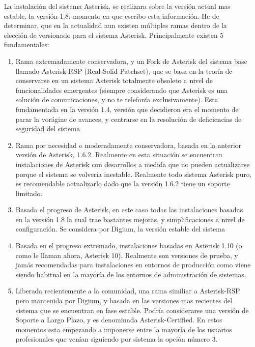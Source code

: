 La instalación del sistema Asterisk, se realizara sobre la versión actual mas estable, la versión 1.8, momento en que escribo esta información. He de determinar, que en la actualidad aun existen múltiples ramas dentro de la elección de versionado para el sistema Asterisk. Principalmente existen 5 fundamentales:

\begin{enumerate}

\item Rama extremadamente conservadora, y un Fork de Asterisk del sistema base llamado Asterisk-RSP (Real Solid Patchset), que se basa en la teoría de conservarse en un sistema Asterisk totalmente obsoleto a nivel de funcionalidades emergentes (siempre considerando que Asterisk es una solución de comunicaciones, y no te telefonía exclusivamente). Esta fundamentada en la versión 1.4, versión que decidieron era el momento de parar la vorágine de avances, y centrarse en la resolución de deficiencias de seguridad del sistema
\item Rama por necesidad o moderadamente conservadora, basada en la anterior versión de Asterisk, 1.6.2. Realmente en esta situación se encuentran instalaciones de Asterisk con desarrollos a medida que no pueden actualizarse porque el sistema se volvería inestable. Realmente todo sistema Asterisk puro, es recomendable actualizarlo dado que la versión 1.6.2 tiene un soporte limitado.
\item Basada el progreso de Asterisk, en este caso todas las instalaciones basadas en la versión 1.8 la cual trae bastantes mejoras, y simplificaciones a nivel de configuración. Se considera por Digium, la versión estable del sistema
\item Basada en el progreso extremado, instalaciones basadas en Asterisk 1.10 (o como le llaman ahora, Asterisk 10). Realmente son versiones de prueba, y jamás recomendadas para instalaciones en entornos de producción como viene siendo habitual en la mayoría de los entornos de administración de sistemas.
\item Liberada recientemente a la comunidad, una rama similiar a Asterisk-RSP pero mantenida por Digium, y basada en las versiones mas recientes del sistema que se encuentran en fase estable. Podría considerarse una versión de Soporte a Largo Plazo, y es denominada Asterisk-Certified. En estos momentos esta empezando a imponerse entre la mayoría de los usuarios profesionales que venían siguiendo por sistema la opción número 3.

\end{enumerate}

